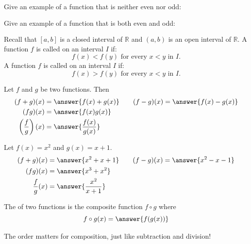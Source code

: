 \documentclass{ximera}
\begin{document}
\begin{exercise}\label{exercise:1-5}
Give an example of a function that is neither even nor odd:
\begin{freeResponse}\end{freeResponse}
\end{exercise}

\begin{exercise}\label{exercise:1-6}
Give an example of a function that is both even and odd:
\begin{freeResponse}\end{freeResponse}
\end{exercise}

Recall that $[a, b]$ is a closed interval of $\mathbb{R}$ and $(a, b)$ is an open interval of $\mathbb{R}$. A function $f$ is called  on an interval $I$ if:
\[
f(x)<f(y) \text { for every } x<y \text { in } I .
\]
A function $f$ is called  on an interval $I$ if:
\[
f(x)>f(y) \text { for every } x<y \text { in } I .
\]

Let $f$ and $g$ be two functions. Then
\[
\begin{aligned}
(f+g)(x) & = \answer{f(x)+g(x)} \qquad (f-g)(x) = \answer{f(x)-g(x)} \\
(f g)(x) & = \answer{f(x)g(x)} \\
\left(\frac{f}{g}\right)(x) & = \answer{\frac{f(x)}{g(x)}}
\end{aligned}
\]

\begin{example}\label{example:1-7}
Let $f(x)=x^{2}$ and $g(x)=x+1$.
\[
\begin{aligned}
(f+g)(x) & = \answer{x^{2}+x+1} \qquad (f-g)(x) = \answer{x^{2}-x-1} \\
(f g)(x) & = \answer{x^{3}+x^{2}} \\
\frac{f}{g}(x) & = \answer{\frac{x^{2}}{x+1}}
\end{aligned}
\]
\end{example}

The  of two functions is the composite function $f \circ g$ where
\[
f \circ g(x)= \answer{f(g(x))}
\]

\begin{warning}
The order matters for composition, just like subtraction and division!
\end{warning}
\end{document}
